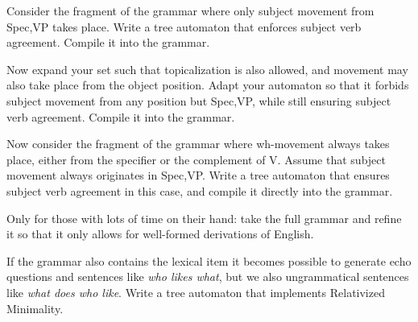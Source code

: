 \begin{exercise}
    Consider the fragment of the grammar where only subject movement from Spec,VP takes place.
    Write a tree automaton that enforces subject verb agreement.
    Compile it into the grammar.
\end{exercise}

\begin{exercise}
    Now expand your set such that topicalization is also allowed, and movement may also take place from the object position.
    Adapt your automaton so that it forbids subject movement from any position but Spec,VP, while still ensuring subject verb agreement.
    Compile it into the grammar.
\end{exercise}

\begin{exercise}
    Now consider the fragment of the grammar where wh-movement always takes place, either from the specifier or the complement of V.
    Assume that subject movement always originates in Spec,VP.
    Write a tree automaton that ensures subject verb agreement in this case, and compile it directly into the grammar.
\end{exercise}

\begin{exercise}
    Only for those with lots of time on their hand: take the full grammar and refine it so that it only allows for well-formed derivations of English.
\end{exercise}

\begin{exercise}
    If the grammar also contains the lexical item  it becomes possible to generate echo questions and sentences like \emph{who likes what}, but we also ungrammatical sentences like \emph{what does who like}.
    Write a tree automaton that implements Relativized Minimality.
\end{exercise}

